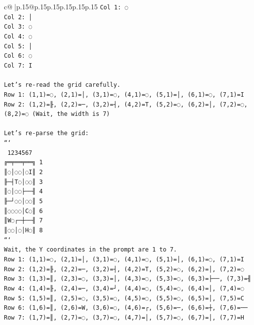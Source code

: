 \documentclass{article}
\begin{document}
{\begin{supertabular}{c@{$\;$}|p{.15\linewidth}@{}p{.15\linewidth}p{.15\linewidth}p{.15\linewidth}p{.15\linewidth}p{.15\linewidth}}
{{{\texttt{Col 1: ◌} \\
\texttt{Col 2: │} \\
\texttt{Col 3: ◌} \\
\texttt{Col 4: ◌} \\
\texttt{Col 5: │} \\
\texttt{Col 6: ◌} \\
\texttt{Col 7: I} \\
\\ 
\texttt{Let's re{-}read the grid carefully.} \\
\texttt{Row 1: (1,1)=◌, (2,1)=│, (3,1)=◌, (4,1)=◌, (5,1)=│, (6,1)=◌, (7,1)=I} \\
\texttt{Row 2: (1,2)=╟, (2,2)=─, (3,2)=┤, (4,2)=T, (5,2)=◌, (6,2)=│, (7,2)=◌, (8,2)=◌ (Wait, the width is 7)} \\
\\ 
\texttt{Let's re{-}parse the grid:} \\
\texttt{```} \\
\texttt{ 1234567} \\
\texttt{╔═╤══╤══╗ 1} \\
\texttt{║◌│◌◌│◌I║ 2} \\
\texttt{╟─┤T◌│◌◌║ 3} \\
\texttt{║◌│◌◌├──╢ 4} \\
\texttt{╟─┘◌◌│◌◌║ 5} \\
\texttt{║◌◌◌◌│C◌║ 6} \\
\texttt{║W◌┌─┼──╢ 7} \\
\texttt{║◌◌│◌│H◌║ 8} \\
\texttt{```} \\
\texttt{Wait, the Y coordinates in the prompt are 1 to 7.} \\
\texttt{Row 1: (1,1)=◌, (2,1)=│, (3,1)=◌, (4,1)=◌, (5,1)=│, (6,1)=◌, (7,1)=I} \\
\texttt{Row 2: (1,2)=╟, (2,2)=─, (3,2)=┤, (4,2)=T, (5,2)=◌, (6,2)=│, (7,2)=◌} \\
\texttt{Row 3: (1,3)=║, (2,3)=◌, (3,3)=│, (4,3)=◌, (5,3)=◌, (6,3)=├──, (7,3)=╢} \\
\texttt{Row 4: (1,4)=╟, (2,4)=─, (3,4)=┘, (4,4)=◌, (5,4)=◌, (6,4)=│, (7,4)=◌} \\
\texttt{Row 5: (1,5)=║, (2,5)=◌, (3,5)=◌, (4,5)=◌, (5,5)=◌, (6,5)=│, (7,5)=C} \\
\texttt{Row 6: (1,6)=║, (2,6)=W, (3,6)=◌, (4,6)=┌, (5,6)=─, (6,6)=┼, (7,6)=──} \\
\texttt{Row 7: (1,7)=║, (2,7)=◌, (3,7)=◌, (4,7)=│, (5,7)=◌, (6,7)=│, (7,7)=H} \\
\\ 
}}}
\end{supertabular}}
\end{document}
